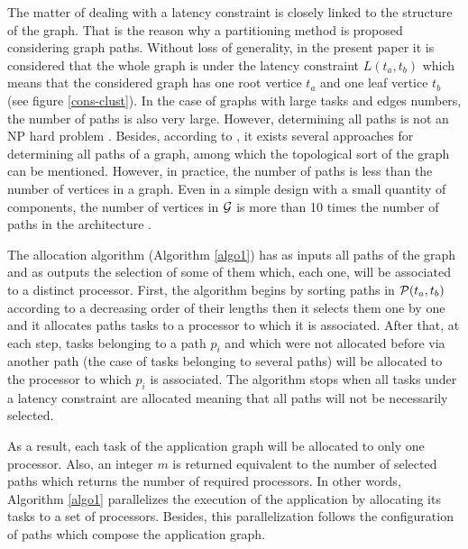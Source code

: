 \documentclass{ijcaArticle}
\begin{document}
The matter of dealing with a latency
constraint is closely linked to the structure of the graph. That is the reason why a partitioning method is proposed considering graph paths. Without loss of generality, in the present paper it is considered that the whole graph is under the latency constraint $L(t_a,t_b)$ which means that the considered graph has one root vertice $t_a$ and one leaf vertice $t_b$ (see figure \ref{cons-clust}). In the case of graphs with large tasks and edges numbers, the number of paths is also very large. However, determining all paths is not an NP hard problem \cite{VisSchKonBor10}. Besides, according to \cite{Tutzauer2007}, it exists several approaches for determining all paths of a graph, among which the topological sort of the graph can be mentioned. However, in practice, the number of paths is less than the number of vertices in a graph. Even in a simple design with a small quantity of components, the number of vertices in $\cal G$ is more than 10 times the number of paths in the architecture \cite{YuchunMa:2007}. 



The allocation algorithm (Algorithm \ref{algo1}) has as inputs all paths of the graph and as outputs the selection of some of them which, each one, will be associated to a distinct processor. First, the algorithm begins by sorting paths in ${\cal P}(t_a,t_b)$ according to a decreasing order of their lengths then it selects them one by one and it allocates paths tasks to a processor to which it is associated. After that, at each step, tasks belonging to a path $p_i$ and which were not allocated before via another path (the case of tasks belonging to several paths) will be allocated to the processor to which $p_i$ is associated. The algorithm stops when all tasks under a latency constraint are allocated meaning that all paths will not be necessarily selected.   

As a result, each task of the application graph will be allocated to only one processor. Also, an integer $m$ is returned equivalent to the number of selected paths which returns 
the number of required processors. In other words, Algorithm \ref{algo1} parallelizes the execution of the application by allocating its tasks to a set of processors. Besides, this parallelization follows the configuration of paths which compose the application graph.    
\end{document}
